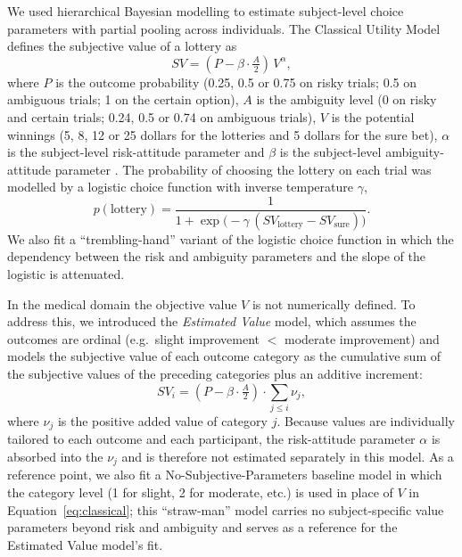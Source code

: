 \documentclass[11pt]{article}
\begin{document}
We used hierarchical Bayesian modelling to estimate subject-level choice parameters with partial pooling across individuals. The Classical Utility Model defines the subjective value of a lottery as
\begin{equation}
SV = \left(P - \beta \cdot \tfrac{A}{2}\right)\, V^{\alpha},
\label{eq:classical}
\end{equation}
where $P$ is the outcome probability (0.25, 0.5 or 0.75 on risky trials; 0.5 on ambiguous trials; 1 on the certain option), $A$ is the ambiguity level (0 on risky and certain trials; 0.24, 0.5 or 0.74 on ambiguous trials), $V$ is the potential winnings (5, 8, 12 or 25 dollars for the lotteries and 5 dollars for the sure bet), $\alpha$ is the subject-level risk-attitude parameter and $\beta$ is the subject-level ambiguity-attitude parameter \citep{levy2012measuring}. The probability of choosing the lottery on each trial was modelled by a logistic choice function with inverse temperature $\gamma$,
\begin{equation}
p(\text{lottery}) = \frac{1}{1 + \exp\!\big(-\gamma\,(SV_{\text{lottery}} - SV_{\text{sure}})\big)}.
\label{eq:logistic}
\end{equation}
We also fit a ``trembling-hand'' variant of the logistic choice function \citep{wu2016loss} in which the dependency between the risk and ambiguity parameters and the slope of the logistic is attenuated.

In the medical domain the objective value $V$ is not numerically defined. To address this, we introduced the \emph{Estimated Value} model, which assumes the outcomes are ordinal (e.g.\ slight improvement $<$ moderate improvement) and models the subjective value of each outcome category as the cumulative sum of the subjective values of the preceding categories plus an additive increment:
\begin{equation}
SV_i = \left(P - \beta \cdot \tfrac{A}{2}\right) \cdot \sum_{j \le i} \nu_j,
\label{eq:estvalue}
\end{equation}
where $\nu_j$ is the positive added value of category $j$. Because values are individually tailored to each outcome and each participant, the risk-attitude parameter $\alpha$ is absorbed into the $\nu_j$ and is therefore not estimated separately in this model. As a reference point, we also fit a No-Subjective-Parameters baseline model in which the category level (1 for slight, 2 for moderate, etc.) is used in place of $V$ in Equation~\ref{eq:classical}; this ``straw-man'' model carries no subject-specific value parameters beyond risk and ambiguity and serves as a reference for the Estimated Value model's fit.
\end{document}
